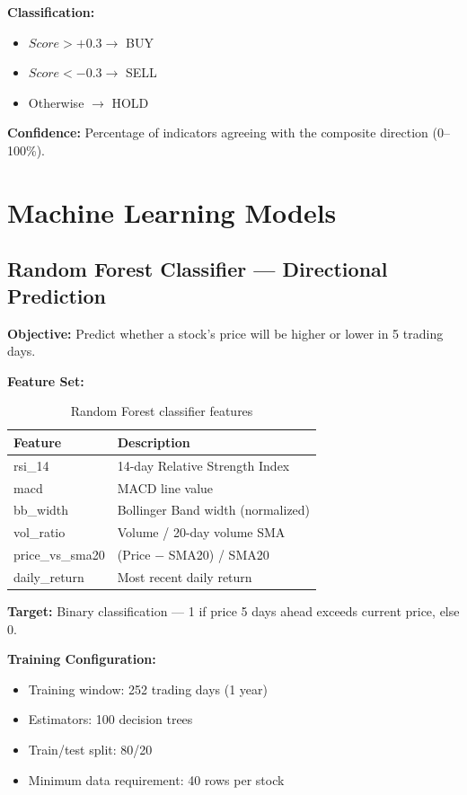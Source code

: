 \documentclass[12pt, a4paper, oneside]{report}
\begin{document}
\textbf{Classification:}
\begin{itemize}[nosep]
    \item $Score > +0.3 \to$ BUY
    \item $Score < -0.3 \to$ SELL
    \item Otherwise $\to$ HOLD
\end{itemize}

\textbf{Confidence:} Percentage of indicators agreeing with the composite direction (0--100\%).

\section{Machine Learning Models}
\label{sec:meth_ml}

\subsection{Random Forest Classifier --- Directional Prediction}

\textbf{Objective:} Predict whether a stock's price will be higher or lower in 5 trading days.

\textbf{Feature Set:}
\begin{table}[H]
\centering
\caption{Random Forest classifier features}
\label{tab:rf_features}
\begin{tabular}{@{}ll@{}}
\toprule
\textbf{Feature} & \textbf{Description} \\
\midrule
rsi\_14 & 14-day Relative Strength Index \\
macd & MACD line value \\
bb\_width & Bollinger Band width (normalized) \\
vol\_ratio & Volume / 20-day volume SMA \\
price\_vs\_sma20 & (Price $-$ SMA20) / SMA20 \\
daily\_return & Most recent daily return \\
\bottomrule
\end{tabular}
\end{table}

\textbf{Target:} Binary classification --- 1 if price 5 days ahead exceeds current price, else 0.

\textbf{Training Configuration:}
\begin{itemize}[nosep]
    \item Training window: 252 trading days (1 year)
    \item Estimators: 100 decision trees
    \item Train/test split: 80/20
    \item Minimum data requirement: 40 rows per stock
\end{itemize}
\end{document}
